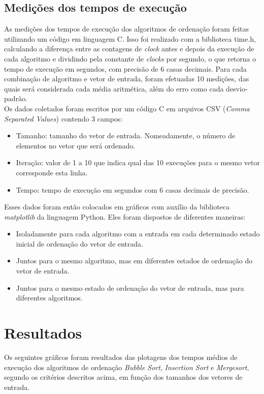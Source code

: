 \documentclass[fontsize=10pt]{article}
\begin{document}
\subsection{Medições dos tempos de execução}
As medições dos tempos de execução dos algoritmos de ordenação foram feitas utilizando um código em linguagem C. Isso foi realizado com a biblioteca time.h, calculando a diferença entre as contagens de \textit{clock} antes e depois da execução de cada algoritmo e dividindo pela constante de \textit{clocks} por segundo, o que retorna o tempo de execução em segundos, com precisão de 6 casas decimais. Para cada combinação de algoritmo e vetor de entrada, foram efetuadas 10 medições, das quais será considerada cada média aritmética, além do erro como cada desvio-padrão.\\

Os dados coletados foram escritos por um código C em arquivos CSV (\textit{Comma Separated Values}) contendo 3 campos:

\begin{itemize}
\item Tamanho: tamanho do vetor de entrada. Nomeadamente, o número de elementos no vetor que será ordenado.
\item Iteração: valor de 1 a 10 que indica qual das 10 execuções para o mesmo vetor corresponde esta linha.
\item Tempo: tempo de execução em segundos com 6 casas decimais de precisão.
\end{itemize}

Esses dados foram então colocados em gráficos com auxílio da biblioteca \textit{matplotlib} da linguagem Python. Eles foram dispostos de diferentes maneiras:

\begin{itemize}
\item Isoladamente para cada algoritmo com a entrada em cada determinado estado inicial de ordenação do vetor de entrada.
\item Juntos para o mesmo algoritmo, mas em diferentes estados de ordenação do vetor de entrada.
\item Juntos para o mesmo estado de ordenação do vetor de entrada, mas para diferentes algoritmos.
\end{itemize}

\section{Resultados}

Os seguintes gráficos foram resultados das plotagens dos tempos médios de execução dos algoritmos de ordenação \textit{Bubble Sort}, \textit{Insertion Sort} e \textit{Mergesort}, segundo os critérios descritos acima, em função dos tamanhos dos vetores de entrada.
\end{document}
